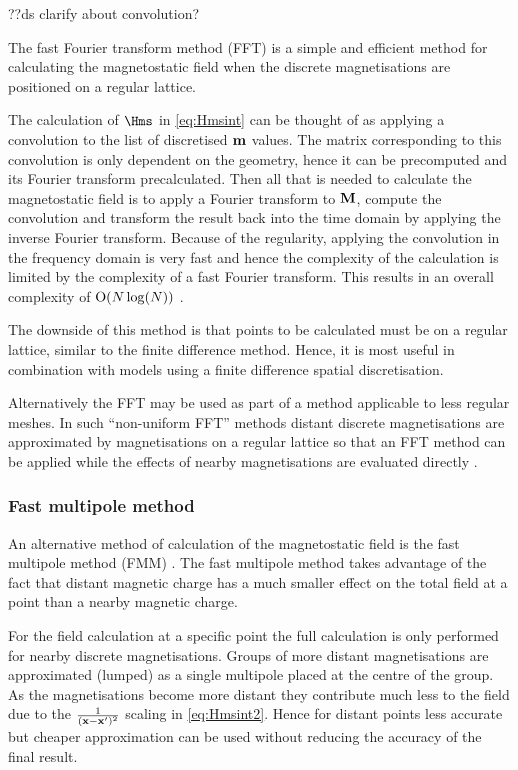 ??ds clarify about convolution?

The fast Fourier transform method (FFT) is a simple and efficient method for calculating the magnetostatic field when the discrete magnetisations are positioned on a regular lattice.

The calculation of $\Hms$ in \cref{eq:Hmsint} can be thought of as applying a convolution to the list of discretised $\boldsymbol{\mathrm{m}}$ values.
The matrix corresponding to this convolution is only dependent on the geometry, hence it can be precomputed and its Fourier transform precalculated.
Then all that is needed to calculate the magnetostatic field is to apply a Fourier transform to $\boldsymbol{\mathrm{M}}$, compute the convolution and transform the result back into the time domain by applying the inverse Fourier transform.
Because of the regularity, applying the convolution in the frequency domain is very fast and hence the complexity of the calculation is limited by the complexity of a fast Fourier transform.
This results in an overall complexity of $\mathrm{O}{\left( N \log(N) \right)}$ \cite{Jones1997}.

The downside of this method is that points to be calculated must be on a regular lattice, similar to the finite difference method.
Hence, it is most useful in combination with models using a finite difference spatial discretisation.

Alternatively the FFT may be used as part of a method applicable to less regular meshes.
In such ``non-uniform FFT'' methods distant discrete magnetisations are approximated by magnetisations on a regular lattice so that an FFT method can be applied while the effects of nearby magnetisations are evaluated directly \cite{Jones1997}.


\subsubsection{Fast multipole method}
\label{sec:fast-mult-meth}

An alternative method of calculation of the magnetostatic field is the fast multipole method (FMM) \cite{Beatson1997}.
The fast multipole method takes advantage of the fact that distant magnetic charge has a much smaller effect on the total field at a point than a nearby magnetic charge.

For the field calculation at a specific point the full calculation is only performed for nearby discrete magnetisations.
Groups of more distant magnetisations are approximated (lumped) as a single multipole placed at the centre of the group.
As the magnetisations become more distant they contribute much less to the field due to the $\frac{1}{(\boldsymbol{\mathrm{x}} - \boldsymbol{\mathrm{x}}')^2}$ scaling in \cref{eq:Hmsint2}.
Hence for distant points less accurate but cheaper approximation can be used without reducing the accuracy of the final result.

